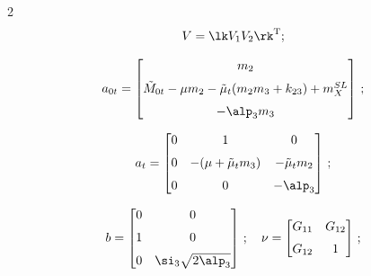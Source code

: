 \begin{multicols}{2}
\begin{equation*}
    V=\lk V_1 V_2\rk^{\mathrm{T}}; %


    \end{equation*}





\noindent


 $$a_{0t} =\begin{bmatrix}


        m_2\\[6pt]


        \tilde M_{0t} -\mu m_2 -\tilde\mu_t( m_2 m_3 + k_{23})+m_X^{SL}\\[6pt]


        -\alp_3 m_3


        \end{bmatrix}\,;


        $$


    $$a_t =\begin{bmatrix}


        0&1&0\\[6pt]


        0&-(\mu+\tilde\mu_t m_3)&-\tilde\mu_t m_2\\[6pt]


        0&0&-\alp_3


        \end{bmatrix}\,;


        $$


\begin{equation*}


b= \begin{bmatrix}


        0&0\\[6pt]


        1&0\\[6pt]


        0&\si_3\sqrt{2\alp_3}


        \end{bmatrix}\,;\quad


    \nu=\begin{bmatrix}


        G_{11}&G_{12}\\[6pt]


        G_{12}&1


        \end{bmatrix}\,; %


        \end{equation*}


 \begin{multline*}



\end{multline*}
\end{multicols}
